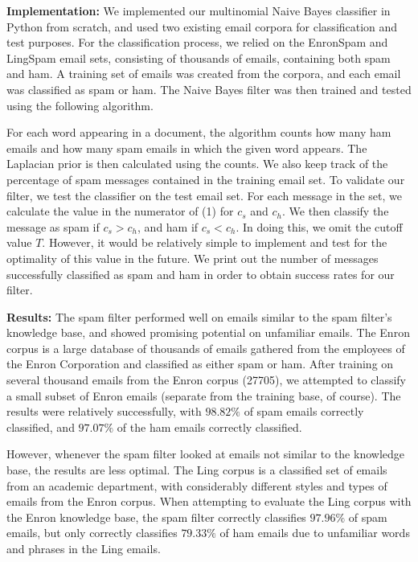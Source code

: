 \documentclass[12pt]{article}
\begin{document}
 \textbf{Implementation:}  We implemented our multinomial Naive Bayes classifier in Python from 
 scratch, and used two existing email corpora for classification and test purposes. For the 
 classification process, we relied on the EnronSpam and LingSpam email sets, consisting of 
 thousands of emails, containing both spam and ham.  A training set of emails was created
 from the corpora, and each email was classified as spam or ham.  The Naive Bayes filter was 
 then trained and tested using the following algorithm.
 
 For each word appearing in a document, the algorithm counts how many ham emails and how many
 spam emails in which the given word appears.  The Laplacian prior is then calculated using the 
 counts.  We also keep track of the percentage of spam messages contained in the training email set.
 To validate our filter, we test the classifier on the test email set.  For each message in the set, we
 calculate the value in the numerator of (1) for $c_s$ and $c_h$.  We then classify the message
 as spam if $c_s > c_h$, and ham if $c_s < c_h$.  In doing this, we omit the cutoff value $T$. 
 However, it would be relatively simple to implement and test for the optimality of this value in the future.
 We print out the number of messages successfully classified as spam and ham in order to obtain
 success rates for our filter.
 
 \textbf{Results:}  
 The spam filter performed well on emails similar to the spam filter's knowledge base, and showed promising potential on unfamiliar emails.  The Enron corpus is a large database of thousands of emails gathered from the employees of the Enron Corporation and classified as either spam or ham.  After training on several thousand emails from the Enron corpus (27705), we attempted to classify a small subset of Enron emails (separate from the training base, of course).  The results were relatively successfully, with $98.82\%$ of spam emails correctly classified, and $97.07\%$ of the ham emails correctly classified.  
 
	However, whenever the spam filter looked at emails not similar to the knowledge base, the results are less optimal.  The Ling corpus is a classified set of emails from an academic department, with considerably different styles and types of emails from the Enron corpus.  When attempting to evaluate the Ling corpus with the Enron knowledge base, the spam filter correctly classifies $97.96\%$ of spam emails, but only correctly classifies $79.33\%$ of ham emails due to unfamiliar words and phrases in the Ling emails.
	
\end{document}
